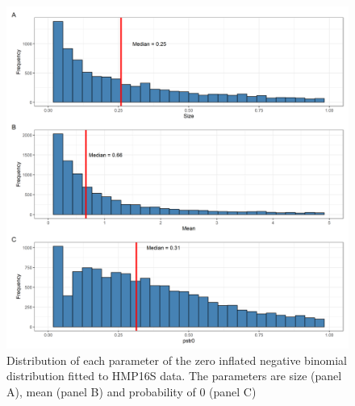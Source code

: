 \documentclass{article}
\begin{document}
\begin{figure}[h]
    \centering
    \includegraphics[width=0.6\linewidth]{figures/HMP_fit.png}
    \caption{Distribution of each parameter of the zero inflated negative binomial distribution fitted to HMP16S data. The parameters are size (panel A), mean (panel B) and probability of 0 (panel C)}
\end{figure}


\newpage
{}

\end{document}
